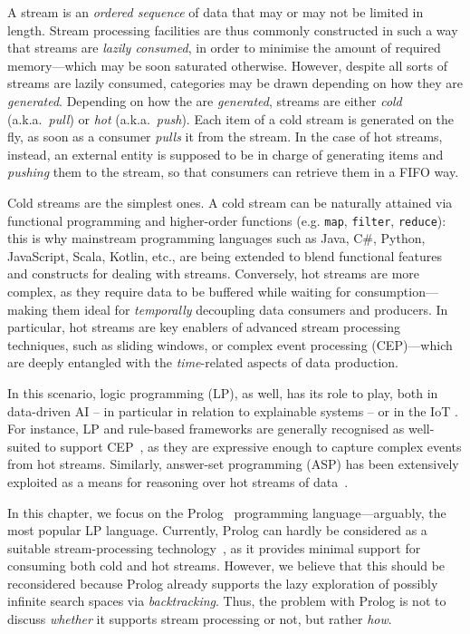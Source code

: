\documentclass[12pt,a4paper,openright,twoside]{book}
\begin{document}
A stream is an \emph{ordered sequence} of data that may or may not be limited in length.
%
Stream processing facilities are thus commonly constructed in such a way that streams are \emph{lazily consumed}, in order to minimise the amount of required memory---which may be soon saturated otherwise.
%
However, despite all sorts of streams are lazily consumed, categories may be drawn depending on how they are \emph{generated}.
%
Depending on how the are \emph{generated}, streams are either \emph{cold} (a.k.a.\ \emph{pull}) or \emph{hot} (a.k.a.\ \emph{push}).
%
Each item of a cold stream is generated on the fly, as soon as a consumer \emph{pulls} it from the stream.
%
In the case of hot streams, instead, an external entity is supposed to be in charge of generating items and \emph{pushing} them to the stream, so that consumers can retrieve them in a FIFO way.

Cold streams are the simplest ones.
%
A cold stream can be naturally attained via functional programming and higher-order functions (e.g. \texttt{map}, \texttt{filter}, \texttt{reduce}): this is why mainstream programming languages such as Java, C\#, Python, JavaScript, Scala, Kotlin, etc., are being extended to blend functional features and constructs for dealing with streams.
%
Conversely, hot streams are more complex, as they require data to be buffered while waiting for consumption---making them ideal for \emph{temporally} decoupling data consumers and producers.
%
In particular, hot streams are key enablers of advanced stream processing techniques, such as sliding windows, or complex event processing (CEP)---which are deeply entangled with the \emph{time}-related aspects of data production.

In this scenario,  logic programming (LP), as well, has its role to play, both in data-driven AI -- in particular in relation to explainable systems \cite{xaisurvey-ia14} -- or in the IoT \cite{lpaas-bdcc2}.
%
For instance,  LP and rule-based frameworks are generally recognised as well-suited to support CEP~\cite{AnicicFRSSS10,AnicicRFS12}, as they are expressive enough to capture complex events from hot streams.
%
Similarly, answer-set programming (ASP) has been extensively exploited as a means for reasoning over hot streams of data~\cite{EiterIST05,BeckEB17,Beck2018}.

In this chapter, we focus on the Prolog~\cite{ColmerauerR93} programming language---arguably, the most popular LP language.
%
Currently, Prolog can hardly be considered as a suitable stream-processing technology~\cite{Tarau2019}, as it provides minimal support for consuming both cold and hot streams.
%
However, we believe that this should be reconsidered because Prolog already supports the lazy exploration of possibly infinite search spaces via \emph{backtracking}.
%
Thus, the problem with Prolog is not to discuss \emph{whether} it supports stream processing or not, but rather \emph{how}.
\end{document}

